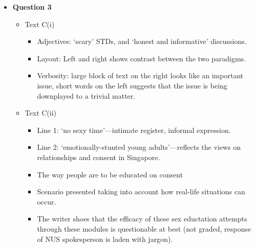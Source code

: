 \documentclass[../main.tex]{subfiles}
\begin{document}
\begin{itemize}
					\item \textbf{Question 3} \begin{itemize}
						\item Text C(i) \begin{itemize}
							\item Adjectives: `scary' STDs, and `honest and informative' discussions.
							\item Layout: Left and right shows contrast between the two paradigms.
							\item Verbosity: large block of text on the right looks like an important issue, short words on the left suggests that the issue is being downplayed to a trivial matter.
						\end{itemize}
						\item Text C(ii) \begin{itemize}
							\item Line 1: `no sexy time'---intimate register, informal expression.
							\item Line 2: `emotionally-stunted young adults'---reflects the views on relationships and consent in Singapore.
							\item The way people are to be educated on consent
							\item Scenario presented taking into account how real-life situations can occur.
							\item The writer shoes that the efficacy of these sex eductation attempts through these modules is questionable at best (not graded, response of NUS spokesperson is laden with jargon).
						\end{itemize}
					\end{itemize}
			

\end{itemize}
\end{document}
